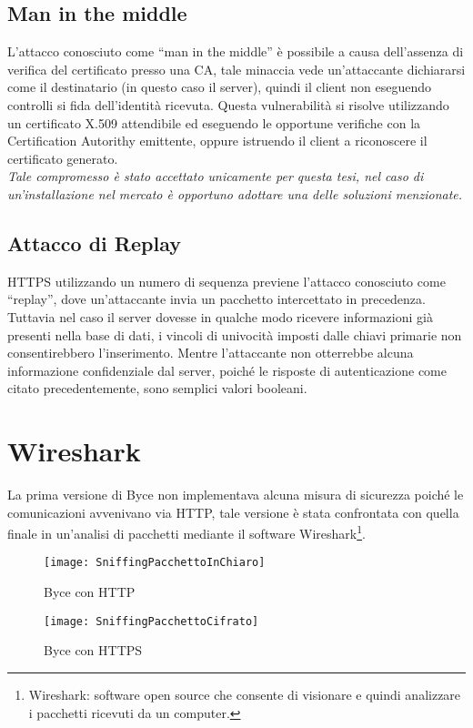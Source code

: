 \documentclass[target=bach]{thud}
\begin{document}
    \subsection{Man in the middle}
    L'attacco conosciuto come ``man in the middle'' è possibile a causa dell'assenza di verifica del certificato presso una CA, tale minaccia vede un'attaccante dichiararsi come il destinatario (in questo caso il server), quindi il client non eseguendo controlli si fida dell'identità ricevuta. Questa vulnerabilità si risolve utilizzando un certificato X.509 attendibile ed eseguendo le opportune verifiche con la Certification Autorithy emittente, oppure istruendo il client a riconoscere il certificato generato.\\
    \textit{Tale compromesso è stato accettato unicamente per questa tesi, nel caso di un'installazione nel mercato è opportuno adottare una delle soluzioni menzionate.}

    \subsection{Attacco di Replay}
    HTTPS utilizzando un numero di sequenza previene l'attacco conosciuto come ``replay'', dove un'attaccante invia un pacchetto intercettato in precedenza. Tuttavia nel caso il server dovesse in qualche modo ricevere informazioni già presenti nella base di dati, i vincoli di univocità imposti dalle chiavi primarie non consentirebbero l'inserimento. Mentre l'attaccante non otterrebbe alcuna informazione confidenziale dal server, poiché le risposte di autenticazione come citato precedentemente, sono semplici valori booleani.

\section{Wireshark}

    La prima versione di Byce non implementava alcuna misura di sicurezza poiché le comunicazioni avvenivano via HTTP,
    tale versione è stata confrontata con quella finale in un'analisi di pacchetti mediante il software Wireshark\footnote[2]{Wireshark: software open source che consente di visionare e quindi analizzare i pacchetti ricevuti da un computer.}.

    \graphicspath{ {./img/} }
    \begin{figure}[h]
        \centering
        \texttt{[image: SniffingPacchettoInChiaro]}
        \caption{Byce con HTTP}
        \label{fig:usecase}

    \end{figure}
    \graphicspath{ {./img/} }
    \begin{figure}[h]
        \centering
        \texttt{[image: SniffingPacchettoCifrato]}
        \caption{Byce con HTTPS}
        \label{fig:usecase}
    \end{figure}
\end{document}
